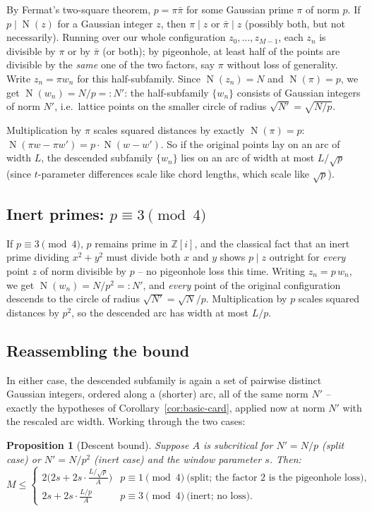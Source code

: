 \documentclass[11pt]{amsart}
\newtheorem{proposition}[theorem]{Proposition}
\theoremstyle{definition}
\theoremstyle{remark}
\newcommand{\Z}{\mathbb{Z}}
\DeclareMathOperator{\Nm}{N}
\newcommand{\nm}[1]{\Nm(#1)}
\begin{document}
By Fermat's two-square theorem, $p = \pi\bar\pi$ for some Gaussian prime $\pi$ of norm $p$. If $p \mid \nm{z}$ for a Gaussian integer $z$, then $\pi\mid z$ or $\bar\pi \mid z$ (possibly both, but not necessarily). Running over our whole configuration $z_0,\dots,z_{M-1}$, each $z_n$ is divisible by $\pi$ or by $\bar\pi$ (or both); by pigeonhole, at least half of the points are divisible by the \emph{same} one of the two factors, say $\pi$ without loss of generality. Write $z_n = \pi w_n$ for this half-subfamily. Since $\nm{z_n}=N$ and $\nm\pi = p$, we get $\nm{w_n} = N/p =: N'$: the half-subfamily $\{w_n\}$ consists of Gaussian integers of norm $N'$, i.e.\ lattice points on the smaller circle of radius $\sqrt{N'}=\sqrt{N/p}$.

Multiplication by $\pi$ scales squared distances by exactly $\nm\pi=p$: $\nm{\pi w - \pi w'} = p\cdot \nm{w-w'}$. So if the original points lay on an arc of width $L$, the descended subfamily $\{w_n\}$ lies on an arc of width at most $L/\sqrt p$ (since $t$-parameter differences scale like chord lengths, which scale like $\sqrt p$).

\subsection{Inert primes: $p \equiv 3 \pmod 4$}

If $p\equiv 3\pmod 4$, $p$ remains prime in $\Z[i]$, and the classical fact that an inert prime dividing $x^2+y^2$ must divide both $x$ and $y$ shows $p \mid z$ outright for \emph{every} point $z$ of norm divisible by $p$ -- no pigeonhole loss this time. Writing $z_n = p\, w_n$, we get $\nm{w_n} = N/p^2 =: N'$, and \emph{every} point of the original configuration descends to the circle of radius $\sqrt{N'} = \sqrt N / p$. Multiplication by $p$ scales squared distances by $p^2$, so the descended arc has width at most $L/p$.

\subsection{Reassembling the bound}

In either case, the descended subfamily is again a set of pairwise distinct Gaussian integers, ordered along a (shorter) arc, all of the same norm $N'$ -- exactly the hypotheses of Corollary~\ref{cor:basic-card}, applied now at norm $N'$ with the rescaled arc width. Working through the two cases:

\begin{proposition}[Descent bound]\label{prop:descent}
Suppose $A$ is subcritical for $N'=N/p$ (split case) or $N'=N/p^2$ (inert case) and the window parameter $s$. Then:
\[
M \le \begin{cases}
\displaystyle 2\Big(2s + 2s\cdot \frac{L/\sqrt p}{A}\Big) & p\equiv 1\!\!\pmod 4 \ \text{(split; the factor $2$ is the pigeonhole loss)},\\[2mm]
\displaystyle 2s + 2s\cdot \frac{L/p}{A} & p\equiv 3 \!\!\pmod 4 \ \text{(inert; no loss)}.
\end{cases}
\]
\end{proposition}
\end{document}
